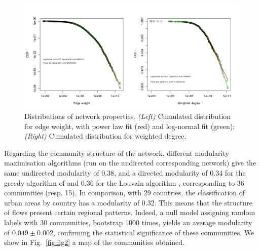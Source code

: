 \documentclass[10pt,letterpaper]{article}
\begin{document}
\begin{figure}
    \begin{center}
        \includegraphics[width=\linewidth]{figures/Fig1.png}
    \end{center}
    \caption{Distributions of network properties. \textit{(Left)} Cumulated distribution for edge weight, with power law fit (red) and log-normal fit (green); \textit{(Right)} Cumulated distribution for weighted degree.}
    \label{fig:nwdist}
\end{figure}


Regarding the community structure of the network, different modularity maximisation algorithms (run on the undirected corresponding network) give the same undirected modularity of 0.38, and a directed modularity \cite{nicosia2009extending} of 0.34 for the greedy algorithm of \cite{clauset2004finding} and 0.36 for the Louvain algorithm \cite{blondel2008fast}, corresponding to 36 communities (resp. 15). In comparison, with 29 countries, the classification of urban areas by country has a modularity of 0.32. This means that the structure of flows present certain regional patterns. Indeed, a null model assigning random labels with 30 communities, bootstrap 1000 times, yields an average modularity of $0.049 \pm 0.002$, confirming the statistical significance of these communities. We show in Fig.~\ref{fig:fig2} a map of the communities obtained.
\end{document}
